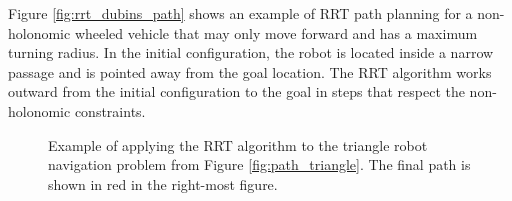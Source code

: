 Figure \ref{fig:rrt_dubins_path} shows an example of RRT path planning
for a non-holonomic wheeled vehicle that may only move forward and has
a maximum turning radius.  In the initial configuration, the robot is
located inside a narrow passage and is pointed away from the goal
location.  The RRT algorithm works outward from the initial
configuration to the goal in steps that respect the non-holonomic
constraints.


\begin{figure}
\begin{center}
 \hspace{.5em}
 \hspace{.5em}
\end{center}
\caption{ Example of applying the RRT algorithm to the triangle robot
  navigation problem from Figure \ref{fig:path_triangle}.  The final
  path is shown in red in the right-most figure.  }
\label{fig:rrt_path}
\end{figure}

